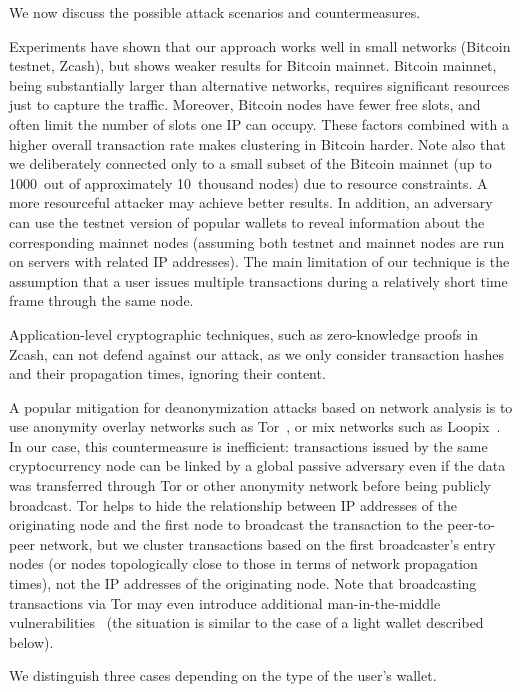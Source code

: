 We now discuss the possible attack scenarios and countermeasures.

Experiments have shown that our approach works well in small networks (Bitcoin testnet, Zcash), but shows weaker results for Bitcoin mainnet.
Bitcoin mainnet, being substantially larger than alternative networks, requires significant resources just to capture the traffic.
Moreover, Bitcoin nodes have fewer free slots, and often limit the number of slots one IP can occupy.
These factors combined with a higher overall transaction rate makes clustering in Bitcoin harder.
Note also that we deliberately connected only to a small subset of the Bitcoin mainnet (up to 1000~out of approximately 10~thousand nodes) due to resource constraints.
A more resourceful attacker may achieve better results.
In addition, an adversary can use the testnet version of popular wallets to reveal information about the corresponding mainnet nodes (assuming both testnet and mainnet nodes are run on servers with related IP addresses).
The main limitation of our technique is the assumption that a user issues multiple transactions during a relatively short time frame through the same node.

Application-level cryptographic techniques, such as zero-knowledge proofs in Zcash, can not defend against our attack, as we only consider transaction hashes and their propagation times, ignoring their content.

A popular mitigation for deanonymization attacks based on network analysis is to use anonymity overlay networks such as Tor~\cite{Tor}, or mix networks such as Loopix~\cite{Piotrowska2017}.
In our case, this countermeasure is inefficient: transactions issued by the same cryptocurrency node can be linked by a global passive adversary even if the data was transferred through Tor or other anonymity network before being publicly broadcast.
Tor helps to hide the relationship between IP addresses of the originating node and the first node to broadcast the transaction to the peer-to-peer network, but we cluster transactions based on the first broadcaster's entry nodes (or nodes topologically close to those in terms of network propagation times), not the IP addresses of the originating node.
Note that broadcasting transactions via Tor may even introduce additional man-in-the-middle vulnerabilities~\cite{Biryukov2015} (the situation is similar to the case of a light wallet described below).

We distinguish three cases depending on the type of the user's wallet.

